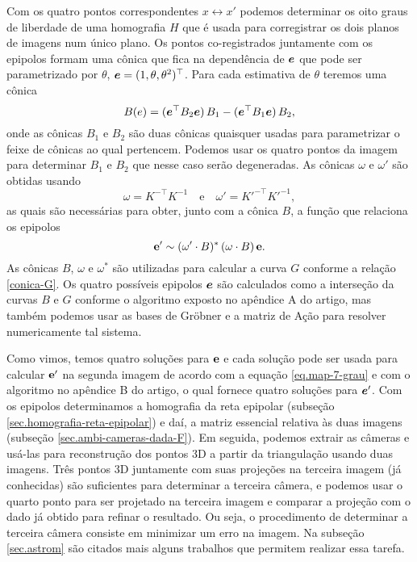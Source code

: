Com os quatro pontos correspondentes $x\leftrightarrow x'$ podemos determinar os oito graus de liberdade de uma homografia $H$ que é usada para corregistrar os dois planos de imagens num único plano. Os pontos co-registrados juntamente com os epipolos formam uma cônica que fica na dependência de $\boldsymbol{e}$ que pode ser parametrizado por $\theta$, $\boldsymbol{e}=(1,\theta,\theta^2)^\top$. Para cada estimativa de $\theta$ teremos uma cônica 
\begin{equation*}
B(e)=(\boldsymbol{e}^\top B_2\boldsymbol{e})\,B_1-(\boldsymbol{e}^\top B_1\boldsymbol{e})\,B_2,
\end{equation*}
onde as cônicas $B_1$ e $B_2$ são duas cônicas quaisquer usadas para parametrizar o feixe de cônicas ao qual pertencem. Podemos usar os quatro pontos da imagem para determinar $B_1$ e $B_2$ que nesse caso serão degeneradas. As cônicas $\omega$ e $\omega'$ são obtidas usando
\begin{equation*}
\omega=K^{-\top}K^{-1}\quad\text{e}\quad\omega'=K'^{-\top}K'^{-1},
\end{equation*}
as quais são necessárias para obter, junto com a cônica $B$, a função que relaciona os epipolos
\begin{equation*}
{\bf e'} \sim (\omega' \cdot B)^*\,(\omega \cdot B)\,{\bf e}.
\end{equation*}
As cônicas $B$, $\omega$ e $\omega^*$ são utilizadas para calcular a curva $G$ conforme a relação \ref{conica-G}. Os quatro possíveis epipolos $\boldsymbol{e}$ são calculados como a interseção da curvas $B$ e $G$ conforme o algoritmo exposto no apêndice A do artigo, mas também podemos usar as bases de Gr\"obner e a matriz de Ação para resolver numericamente tal sistema.

Como vimos, temos quatro soluções para   ${\bf e}$ e cada solução pode ser usada para calcular ${\bf e'}$ na segunda imagem de acordo com a equação \ref{eq.map-7-grau} e com o algoritmo no apêndice B do artigo, o qual fornece quatro soluções para $\boldsymbol{e}'$. Com os epipolos determinamos a homografia da reta epipolar (subseção \ref{sec.homografia-reta-epipolar}) e daí, a matriz essencial relativa às duas imagens (subseção \ref{sec.ambi-cameras-dada-F}). Em seguida, podemos extrair as câmeras e usá-las para reconstrução dos pontos 3D a partir da triangulação usando duas imagens. Três pontos 3D juntamente com suas projeções na terceira imagem (já conhecidas) são suficientes para determinar a terceira câmera, e podemos usar o quarto ponto para ser projetado na terceira imagem e comparar a projeção com o dado já obtido para refinar o resultado. Ou seja, o procedimento de determinar a terceira câmera consiste em minimizar um erro na imagem. Na subseção \ref{sec.astrom} são citados mais alguns trabalhos que permitem realizar essa tarefa.

